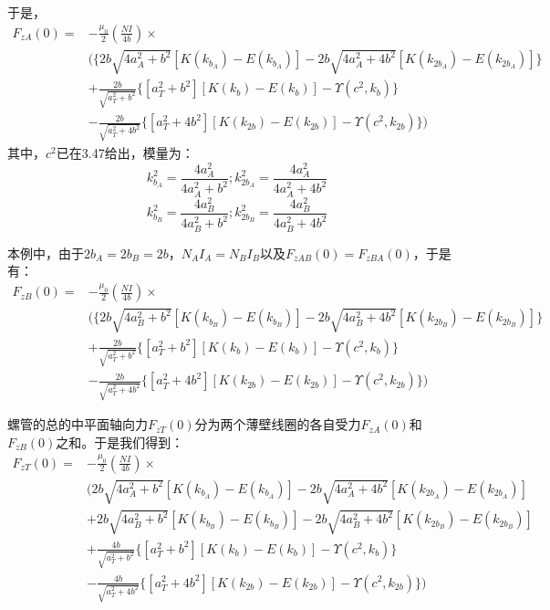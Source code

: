 于是，
\begin{equation}
\begin{split}
F_{zA}(0)=&-\frac{\mu_0}{2}(\frac{N I}{4b})\times \\
&( \{2b\sqrt{4a_A^2+b^2}[K(k_{b_A})-E(k_{b_A})]-2b\sqrt{4a_A^2+4b^2}[K(k_{2b_A})-E(k_{2b_A})]\}\\
&+\frac{2b}{\sqrt{a_T^2+b^2}} \{[a_T^2+b^2][K(k_{b})-E(k_{b})]-\Upsilon(c^2,k_b)\}\\
&-\frac{2b}{\sqrt{a_T^2+4b^2}} \{[a_T^2+4b^2][K(k_{2b})-E(k_{2b})]-\Upsilon(c^2,k_{2b}) \})
\end{split}
\end{equation}
其中，$c^2$已在3.47给出，模量为：
$$k_{b_A}^2=\frac{4a_A^2}{4a_A^2+b^2} ; k_{2b_A}^2=\frac{4a^2_A}{4a_A^2+4b^2} $$
$$k_{b_B}^2=\frac{4a_B^2}{4a_B^2+b^2} ; k_{2b_B}^2=\frac{4a^2_B}{4a_B^2+4b^2} $$

本例中，由于$2b_A=2b_B=2b$，$N_A I_A=N_B I_B$以及$F_{zAB}(0)=F_{zBA}(0)$，于是有：
\begin{equation*}
\begin{split}
F_{zB}(0)=&-\frac{\mu_0}{2}(\frac{N I}{4b})\times \\
&( \{2b\sqrt{4a_B^2+b^2}[K(k_{b_B})-E(k_{b_B})]-2b\sqrt{4a_B^2+4b^2}[K(k_{2b_B})-E(k_{2b_B})]\}\\
&+\frac{2b}{\sqrt{a_T^2+b^2}} \{[a_T^2+b^2][K(k_{b})-E(k_{b})]-\Upsilon(c^2,k_b)\}\\
&-\frac{2b}{\sqrt{a_T^2+4b^2}} \{[a_T^2+4b^2][K(k_{2b})-E(k_{2b})]-\Upsilon(c^2,k_{2b}) \})
\end{split}
\end{equation*}

螺管的总的中平面轴向力$F_{zT}(0)$分为两个薄壁线圈的各自受力$F_{zA}(0)$和$F_{zB}(0)$之和。于是我们得到：
\begin{equation}
\begin{split}
F_{zT}(0)=&-\frac{\mu_0}{2}(\frac{N I}{4b})\times \\
&( 2b\sqrt{4a_A^2+b^2}[K(k_{b_A})-E(k_{b_A})]-2b\sqrt{4a_A^2+4b^2}[K(k_{2b_A})-E(k_{2b_A})]\\
&+2b\sqrt{4a_B^2+b^2}[K(k_{b_B})-E(k_{b_B})]-2b\sqrt{4a_B^2+4b^2}[K(k_{2b_B})-E(k_{2b_B})]\\
&+\frac{4b}{\sqrt{a_T^2+b^2}} \{[a_T^2+b^2][K(k_{b})-E(k_{b})]-\Upsilon(c^2,k_b)\}\\
&-\frac{4b}{\sqrt{a_T^2+4b^2}} \{[a_T^2+4b^2][K(k_{2b})-E(k_{2b})]-\Upsilon(c^2,k_{2b}) \})
\end{split}
\end{equation}

